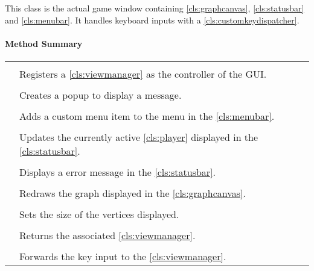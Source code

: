 This class is the actual game window containing \ref{cls:graphcanvas}, \ref{cls:statusbar} and \ref{cls:menubar}. It handles keyboard inputs with a \ref{cls:customkeydispatcher}. \\ 

\centerdash

\paragraph*{Method Summary}
\paragraph*{}
\begin{longtable}{Lp{10cm}}
	\startmethodtable
	 \\
	& Registers a \ref{cls:viewmanager} as the controller of the GUI. \\
	 \\
	& Creates a popup to display a message. \\
	 \\
	& Adds a custom menu item to the menu in the \ref{cls:menubar}. \\ 
	\\
	& Updates the currently active \ref{cls:player} displayed in the \ref{cls:statusbar}. \\
	 \\
	& Displays a error message in the \ref{cls:statusbar}. \\
	 \\
	& Redraws the graph displayed in the \ref{cls:graphcanvas}. \\ 
	 \\
	& Sets the size of the vertices displayed. \\ 
	 \\
	& Returns the  associated \ref{cls:viewmanager}. \\
	 \\
	& Forwards the key input to the \ref{cls:viewmanager}. \\
	\hline
\end{longtable}

